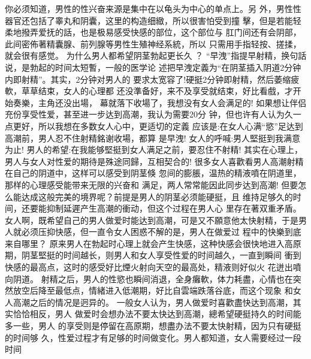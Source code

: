 \documentclass[12pt,UTF8]{ctexbook}
\begin{document}
你必须知道，男性的性兴奋来源是集中在以龟头为中心的单点上。另
外，男性性器官还包括了睾丸和阴囊，这里的构造细緻，所以很害怕受到撞
擊，但是若能轻柔地撥弄爱抚的話，也是极易感受快感的部位，这个部位与
肛门间还有会阴部，此间密佈著精囊腺、前列腺等男性生殖神经系統，所以
只需用手指轻按、搓揉，就会很有感觉。
为什么男人都希望阴茎勃起更长久 ？
“早洩”指提早射精，换句話说，是勃起的时间太短暫，一般的医学论
述把早洩定義为“在阴茎插入阴道2分钟内即射精”。其实，2分钟对男人的
要求太宽容了!硬挺2分钟即射精，然后萎缩疲軟，草草结束，女人的心理都
还没準备好，来不及享受就结束，好比看戲，才开始奏樂，主角还没出場，
幕就落下收場了，我想没有女人会满足的!
如果想让伴侣充份享受性爱，甚至进一步达到高潮，我认为需要20分
钟，但也许有人认为久一点更好，所以我想在多数女人心中，更适切的定義
应该是:在女人心满“慾”足达到高潮前，男人忍不住射精銘谢收場，都算
是早洩!
女人的呼喊:男人堅挺到我满意为止!
男人的希望:在我能够堅挺到女人满足之前，要忍住不射精!
其实在心理上，男人与女人对性爱的期待是殊途同歸，互相契合的!
很多女人喜歡看男人高潮射精在自己的阴道中，这样可以感受到阴茎倏
忽间的膨脹，温热的精液噴在阴道里，那样的心理感受能带来无限的兴奋和
满足，两人常常能因此同步达到高潮!
但要怎么能达成这般完美的境界呢？前提是男人的阴茎必须能硬挺，且
维持足够久的时间，还要能抑制延遲产生高潮的衝动，但这个过程在男人心
里存在著双重矛盾。
女人啊，既希望自己的男人做爱时能达到高潮，可是又不願意他太快射精，于是男人就必须压抑快感，但一直令女人困惑不解的是，男人在做爱过
程中的快樂到底来自哪里？
原来男人在勃起时心理上就会产生快感，这种快感会很快地进入高原
期，阴茎堅挺的时间越长，则男人和女人享受性爱的时间越久，一直到瞬间
衝到快感的最高点，这时的感受好比煙火射向天空的最高处，精液则好似火
花迸出噴向阴道。
射精之后，男人的性慾也瞬间消退，全身癱軟，体力耗盡，心情也在突
然放空后降至最低点，情緒进入低潮期，好比自雲端跌落谷底，而这个现象
和女人高潮之后的情况是迥异的。
一般女人认为，男人做爱时喜歡盡快达到高潮，其实恰恰相反，男人
做爱时会想办法不要太快达到高潮，總希望硬挺持久的时间能多一些，男人
的享受则是停留在高原期，想盡办法不要太快射精，因为只有硬挺的时间够
久，性爱过程才有足够的时间做变化。男人都知道，女人需要经过一段时间
\end{document}
